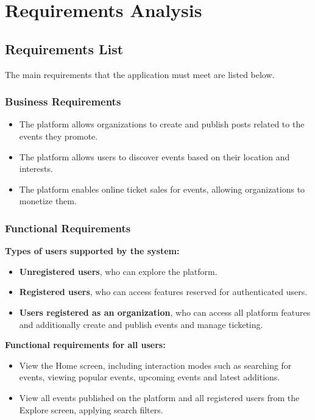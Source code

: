 \section{Requirements Analysis}

\subsection{Requirements List}

The main requirements that the application must meet are listed below.

\subsubsection{Business Requirements}

\begin{itemize}
  \item The platform allows organizations to create and publish posts related to the events they promote.
  \item The platform allows users to discover events based on their location and interests.
  \item The platform enables online ticket sales for events, allowing organizations to monetize them.
\end{itemize}

\subsubsection{Functional Requirements}

\noindent\textbf{Types of users supported by the system:}
\begin{itemize}
  \item \textbf{Unregistered users}, who can explore the platform.
  \item \textbf{Registered users}, who can access features reserved for authenticated users.
  \item \textbf{Users registered as an organization}, who can access all platform features and additionally create and publish events and manage ticketing.
\end{itemize}

\noindent\textbf{Functional requirements for all users:}
\begin{itemize}
  \item View the Home screen, including interaction modes such as searching for events, viewing popular events, upcoming events and latest additions.
  \item View all events published on the platform and all registered users from the Explore screen, applying search filters.
\end{itemize}

